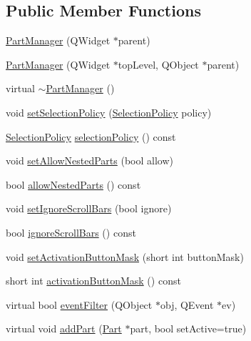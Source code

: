 \subsection*{\-Public \-Member \-Functions}
\begin{DoxyCompactItemize}
\item 
\hyperlink{classKParts_1_1PartManager_ad46e63f77ab7dc553f189f7078fee8c8}{\-Part\-Manager} (\-Q\-Widget $\ast$parent)
\item 
\hyperlink{classKParts_1_1PartManager_a549d5b81307465317130047f3ffeb92c}{\-Part\-Manager} (\-Q\-Widget $\ast$top\-Level, \-Q\-Object $\ast$parent)
\item 
virtual \hyperlink{classKParts_1_1PartManager_ac5a751da0f9ca33698b2e2e9d0e5a8d1}{$\sim$\-Part\-Manager} ()
\item 
void \hyperlink{classKParts_1_1PartManager_a1b9382654eab488363d5f96364dee7ec}{set\-Selection\-Policy} (\hyperlink{classKParts_1_1PartManager_a7db25fb7e7f91548fa15566b3af4bb34}{\-Selection\-Policy} policy)
\item 
\hyperlink{classKParts_1_1PartManager_a7db25fb7e7f91548fa15566b3af4bb34}{\-Selection\-Policy} \hyperlink{classKParts_1_1PartManager_a8bf881c3df8e6993e228d4cc63e600f1}{selection\-Policy} () const 
\item 
void \hyperlink{classKParts_1_1PartManager_a141f0dc6283775ecd64a9098b434f7dd}{set\-Allow\-Nested\-Parts} (bool allow)
\item 
bool \hyperlink{classKParts_1_1PartManager_afd5a6425e74a5199ece97a1fc52375b3}{allow\-Nested\-Parts} () const 
\item 
void \hyperlink{classKParts_1_1PartManager_a83d83a92c295bc560166f9f3d7042919}{set\-Ignore\-Scroll\-Bars} (bool ignore)
\item 
bool \hyperlink{classKParts_1_1PartManager_ac92933cad3010594b6572b7e680f39e0}{ignore\-Scroll\-Bars} () const 
\item 
void \hyperlink{classKParts_1_1PartManager_a1f7d9cd024ca16b2536e8fb415490932}{set\-Activation\-Button\-Mask} (short int button\-Mask)
\item 
short int \hyperlink{classKParts_1_1PartManager_ac17b67e82fd11a3c59476c2724c9b489}{activation\-Button\-Mask} () const 
\item 
virtual bool \hyperlink{classKParts_1_1PartManager_a7c8b0609da38332cbe2675fff6502e6e}{event\-Filter} (\-Q\-Object $\ast$obj, \-Q\-Event $\ast$ev)
\item 
virtual void \hyperlink{classKParts_1_1PartManager_afe85fcc6ec3dbcb401a66c1bf24391e5}{add\-Part} (\hyperlink{classKParts_1_1Part}{\-Part} $\ast$part, bool set\-Active=true)

\end{DoxyCompactItemize}
